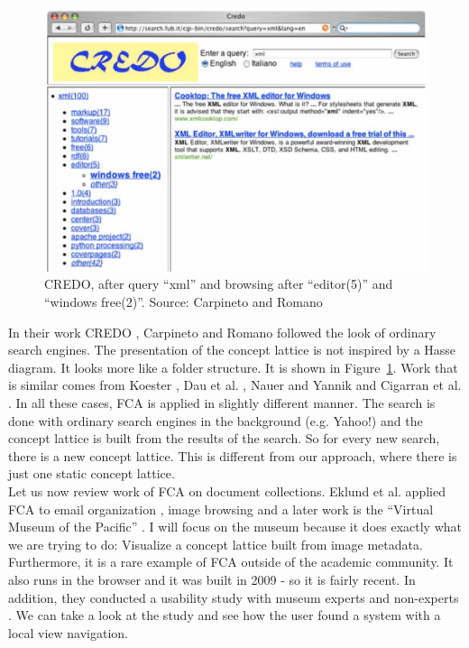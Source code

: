 \documentclass[11pt]{report}
\begin{document}
\begin{figure}[!ht]
	\centering
	\includegraphics[width=\linewidth]{images/credo}
\caption{CREDO, after query ``xml'' and browsing after ``editor(5)'' and ``windows free(2)''. Source: Carpineto and Romano \cite{Carpineto2004} }
\label{figure:credo}
\end{figure}

In their work CREDO \cite{Carpineto2004}, Carpineto and Romano followed the look of ordinary search engines. The presentation of the concept lattice is not inspired by a Hasse diagram. It looks more like a folder structure. It is shown in Figure~\ref{figure:credo}. Work that is similar comes from Koester \cite{Koester2006}, Dau et al. \cite{Dau2008}, Nauer and Yannik \cite{Nauer2009} and Cigarran et al. \cite{Cigarran2004}. In all these cases, FCA is applied in slightly different manner. The search is done with ordinary search engines in the background (e.g. Yahoo!) and the concept lattice is built from the results of the search. So for every new search, there is a new concept lattice. This is different from our approach, where there is just one static concept lattice. \\

Let us now review work of FCA on document collections. Eklund et al. applied FCA to email organization \cite{Eklund2004}, image browsing \cite{Ducrou2006,Ducrou2008} and a later work is the ``Virtual Museum of the Pacific'' \cite{Eklund2009,Eklund2012}. I will focus on the museum because it does exactly what we are trying to do: Visualize a concept lattice built from image metadata. Furthermore, it is a rare example of FCA outside of the academic community. It also runs in the browser and it was built in 2009 - so it is fairly recent. In addition, they conducted a usability study with museum experts and non-experts \cite{Eklund2012}. We can take a look at the study and see how the user found a system with a local view navigation.
\end{document}
